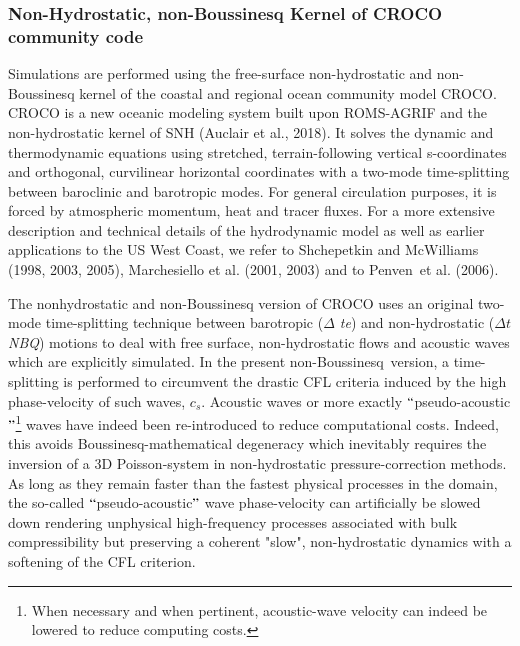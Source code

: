 \subsubsection{Non-Hydrostatic, non-Boussinesq Kernel of CROCO community code}

\vspace{\baselineskip}
Simulations are performed using the free-surface non-hydrostatic and non-Boussinesq kernel of the coastal and regional ocean community model CROCO. CROCO is a new oceanic modeling system built upon ROMS-AGRIF and the non-hydrostatic kernel of SNH (Auclair et al., 2018). It solves the dynamic and thermodynamic equations using stretched, terrain-following vertical s-coordinates and orthogonal, curvilinear horizontal coordinates with a two-mode time-splitting between baroclinic and barotropic modes. For general circulation purposes, it is forced by atmospheric momentum, heat and tracer fluxes. For a more extensive description and technical details of the hydrodynamic model as well as earlier applications to the US West Coast, we refer to Shchepetkin and McWilliams (1998, 2003, 2005), Marchesiello et al. (2001, 2003) and to Penven\ et al. (2006).  \par

\vspace{\baselineskip}
The nonhydrostatic and non-Boussinesq version of CROCO uses an original two-mode time-splitting technique between barotropic (\textit{$ \Delta $ t}{\fontsize{7pt}{8.4pt}\selectfont \textit{e}}) and non-hydrostatic (\textit{$ \Delta t$}{\fontsize{7pt}{8.4pt}\selectfont \textit{NBQ}}) motions to deal with free surface, non-hydrostatic flows and acoustic waves which are explicitly simulated. In the present non-Boussinesq\ version, a time-splitting is performed to circumvent the drastic CFL criteria induced by the high phase-velocity of such waves, $c_s$. Acoustic waves or more exactly $``$pseudo-acoustic$"$\footnote{When necessary and when pertinent, acoustic-wave velocity can indeed be lowered to reduce computing costs.}  waves have indeed been re-introduced to reduce computational costs. Indeed, this avoids Boussinesq-mathematical degeneracy which inevitably requires the inversion of a 3D Poisson-system in non-hydrostatic pressure-correction methods. As long as they remain faster than the fastest physical processes in the domain, the so-called $``$pseudo-acoustic$"$ wave phase-velocity can artificially be slowed down rendering unphysical high-frequency processes associated with bulk compressibility but preserving a coherent "slow", non-hydrostatic dynamics with a softening of the CFL criterion.\par

